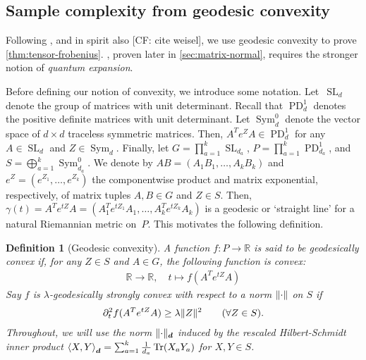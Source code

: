 \documentclass{article}
\newtheorem{definition}{Definition}
\DeclarePairedDelimiter{\norm}{\lVert}{\rVert}
\newcommand{\R}{{\mathbb{R}}}
\renewcommand{\vec}{\bm}
\newcommand\SL{\operatorname{SL}}
\newcommand\PD{\operatorname{PD}}
\newcommand\Sym{\operatorname{Sym}}
\newcommand\tr{\operatorname{Tr}}
\newcommand{\CF}[1]{{\color{purple}[CF: #1]}}
\begin{document}
\subsection{Sample complexity from geodesic convexity}\label{subsec:outline}
Following \cite{FM20}, and in spirit also \CF{cite weisel}, we use geodesic convexity to prove \cref{thm:tensor-frobenius}.
, proven later in \cref{sec:matrix-normal}, requires the stronger notion of \emph{quantum expansion}.

Before defining our notion of convexity, we introduce some notation.
Let~$\SL_d$ denote the group of matrices with unit determinant.
Recall that $\PD_d^1$ denotes the positive definite matrices with unit determinant.
Let $\Sym_d^0$ denote the vector space of $d\times d$ traceless symmetric matrices.
Then, $A^T e^Z A \in \PD_d^1$ for any $A \in \SL_d$ and $Z\in\Sym_d$.
Finally, let $G = \prod_{a=1}^k \SL_{d_a}$, $P = \prod_{a=1}^k \PD_{d_a}^1$, and $S = \bigoplus_{a=1}^k \Sym_{d_a}^0$.
We denote by $AB=(A_1B_1,\dots,A_kB_k)$ and $e^Z=(e^{Z_1},\dots,e^{Z_k})$ the componentwise product and matrix exponential, respectively, of matrix tuples $A, B \in G$ and $Z\in S$.
Then, $\gamma(t) = A^T e^{tZ} A = (A_1^T e^{t Z_1} A_1, \dots, A_k^T e^{t Z_k} A_k)$ is a geodesic or `straight line' for a natural Riemannian metric on~$P$.
This motivates the following definition.

\begin{definition}[Geodesic convexity]
A function $f\colon P \to \R$ is said to be \emph{geodesically convex} if, for any $Z \in S$ and $A \in G$, the following function is convex:
\begin{align*}
  \R \to \R, \quad t \mapsto f(A^T e^{t Z} A)
\end{align*}
Say $f$ is \emph{$\lambda$-geodesically strongly convex} with respect to a norm $\norm\cdot$ on $S$ if
\begin{align*}
  \partial^2_t f(A^T e^{t Z} A) \geq \lambda \norm{Z}^2 \qquad (\forall Z\in S).
\end{align*}
Throughout, we will use the norm $\norm{\cdot}_{\vec d}$ induced by the rescaled Hilbert-Schmidt inner product $\braket{X, Y}_{\vec d} = \sum_{a=1}^k \frac1{d_a} \tr(X_a Y_a)$ for $X, Y \in S$.
\end{definition}
\end{document}
